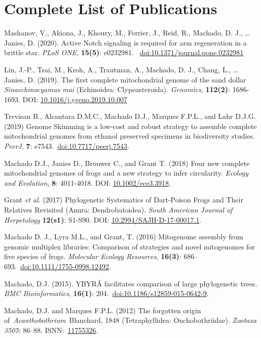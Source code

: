 
\section{Complete List of Publications}

	{
		\setlength{\parskip}{.5em}\renewcommand{\baselinestretch}{2.0}
		\begin{hangparas}{.25in}{1}
	
	    Mashanov, V., Akiona, J., Khoury, M., Ferrier, J., Reid, R., Machado, D. J., … Janies, D. (2020). Active Notch signaling is required for arm regeneration in a brittle star. \emph{PLoS ONE}, \textbf{15(5)}: e0232981. ~\href{https://doi.org/10.1371/journal.pone.0232981}{doi:10.1371/journal.pone.0232981}
	    
	    Lin, J.-P., Tsai, M., Kroh, A., Trautman, A., Machado, D. J., Chang, L., … Janies, D. (2019). The first complete mitochondrial genome of the sand dollar \emph{Sinaechinocyamus mai} (Echinoidea: Clypeasteroida). \emph{Genomics}, \textbf{112(2)}: 1686-1693. DOI: \href{https://doi.org/10.1016/j.ygeno.2019.10.007}{10.1016/j.ygeno.2019.10.007}
	
		Trevisan B., Alcantara D.M.C., Machado D.J., Marques F.P.L., and Lahr D.J.G. (2019) Genome Skimming is a low-cost and robust strategy to assemble complete mitochondrial genomes from ethanol preserved specimens in biodiversity studies. \emph{PeerJ}, \textbf{7}: e7543.~\href{https://doi.org/10.7717/peerj.7543}{doi:10.7717/peerj.7543}.

		Machado D.J., Janies D., Brouwer C., and Grant T. (2018) Four new complete mitochondrial genomes of frogs and a new strategy to infer circularity. \emph{Ecology and Evolution}, \textbf{8}: 4011-4018. DOI: \href{http://doi.wiley.com/10.1002/ece3.3918}{10.1002/ece3.3918}.

		Grant \emph{et al}. (2017) Phylogenetic Systematics of Dart-Poison Frogs and Their Relatives Revisited (Anura: Dendrobatoidea). \emph{South American Journal of Herpetology} \textbf{12(s1)}: S1-S90. DOI: \href{http://www.bioone.org/doi/10.2994/SAJH-D-17-00017.1}{10.2994/SAJH-D-17-00017.1}.

		Machado D. J., Lyra M.L., and Grant, T. (2016) Mitogenome assembly from genomic multiplex libraries: Comparison of strategies and novel mitogenomes for five species of frogs. \emph{Molecular Ecology Resources}, \textbf{16(3)}: 686--693.~\href{https://doi.org/10.1111/1755-0998.12492}{doi:10.1111/1755-0998.12492}.

		Machado, D.J. (2015). YBYRÁ facilitates comparison of large phylogenetic trees. \emph{BMC Bioinformatics}, \textbf{16(1)}: 204.~\href{https://doi.org/10.1186/s12859-015-0642-9}{doi:10.1186/s12859-015-0642-9}.

		Machado, D.J. and Marques F.P.L. (2012) The forgotten origin of~\emph{Acanthobothrium}~Blanchard, 1848 (Tetraphyllidea: Onchobothriidae). \emph{Zootaxa} \emph{3505}: 86--88. ISNN:~\href{http://www.mapress.com/zootaxa/2012/f/z03505p088f.pdf}{11755326}.

		\end{hangparas}
	}

